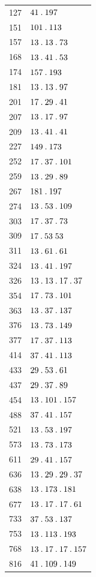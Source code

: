 \begin{longtable}{@{}r|l@{}}
127 & $41\mathbin{.} 197$\\
151 & $101\mathbin{.} 113$\\
157 & $13\mathbin{.} 13\mathbin{.} 73$\\
168 & $13\mathbin{.} 41\mathbin{.} 53$\\
174 & $157\mathbin{.} 193$\\
181 & $13\mathbin{.} 13\mathbin{.} 97$\\
201 & $17\mathbin{.} 29\mathbin{.} 41$\\
207 & $13\mathbin{.} 17\mathbin{.} 97$\\
209 & $13\mathbin{.} 41\mathbin{.} 41$\\
227 & $149\mathbin{.} 173$\\
252 & $17\mathbin{.} 37\mathbin{.} 101$\\
259 & $13\mathbin{.} 29\mathbin{.} 89$\\
267 & $181\mathbin{.} 197$\\
274 & $13\mathbin{.} 53\mathbin{.} 109$\\
303 & $17\mathbin{.} 37\mathbin{.} 73$\\
309 & $17\mathbin{.} 53\;53$\\
311 & $13\mathbin{.} 61\mathbin{.} 61$\\
324 & $13\mathbin{.} 41\mathbin{.} 197$\\
326 & $13\mathbin{.} 13\mathbin{.} 17\mathbin{.} 37$\\
354 & $17\mathbin{.} 73\mathbin{.} 101$\\
363 & $13\mathbin{.} 37\mathbin{.} 137$\\
376 & $13\mathbin{.} 73\mathbin{.} 149$\\
377 & $17\mathbin{.} 37\mathbin{.} 113$\\
414 & $37\mathbin{.} 41\mathbin{.} 113$\\
433 & $29\mathbin{.} 53\mathbin{.} 61$\\
437 & $29\mathbin{.} 37\mathbin{.} 89$\\
454 & $13\mathbin{.} 101\mathbin{.} 157$\\
488 & $37\mathbin{.} 41\mathbin{.} 157$\\
521 & $13\mathbin{.} 53\mathbin{.} 197$\\
573 & $13\mathbin{.} 73\mathbin{.} 173$\\
611 & $29\mathbin{.} 41\mathbin{.} 157$\\
636 & $13\mathbin{.} 29\mathbin{.} 29\mathbin{.} 37$\\
638 & $13\mathbin{.} 173\mathbin{.} 181$\\
677 & $13\mathbin{.} 17\mathbin{.} 17\mathbin{.} 61$\\
733 & $37\mathbin{.} 53\mathbin{.} 137$\\
753 & $13\mathbin{.} 113\mathbin{.} 193$\\
768 & $13\mathbin{.} 17\mathbin{.} 17\mathbin{.} 157$\\
816 & $41\mathbin{.} 109\mathbin{.} 149$\\

\end{longtable}
